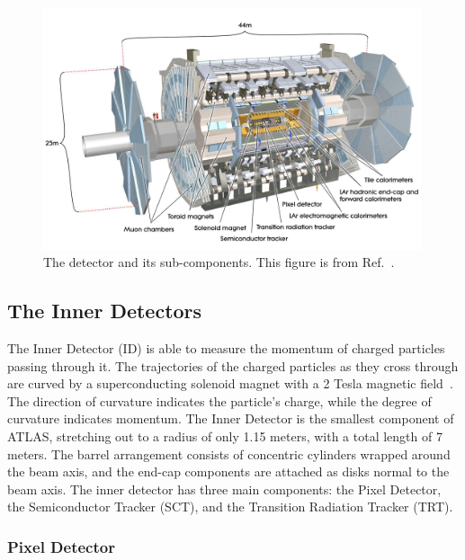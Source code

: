 

\begin{figure}[htb!]
    \centering
    \includegraphics[width=0.99\textwidth]{Figures/LHC/ATLASDetector.jpg}
    \caption{The \ATLAS detector and its sub-components. This figure is from Ref.~\cite{Reed:2014}.}
    \label{fig:atlasdetector}
\end{figure}

\subsection{The Inner Detectors} \label{ssec:ATLASID}
The Inner Detector (ID) is able to measure the momentum of charged particles passing through it. The trajectories of the charged particles as they cross through are curved by a superconducting solenoid magnet with a 2 Tesla magnetic field~\cite{Yamamoto:1999}. The direction of curvature indicates the particle's charge, while the degree of curvature indicates momentum. The Inner Detector is the smallest component of ATLAS, stretching out to a radius of only 1.15 meters, with a total length of 7 meters. The barrel arrangement consists of concentric cylinders wrapped around the beam axis, and the end-cap components are attached as disks normal to the beam axis. The inner detector has three main components: the Pixel Detector, the Semiconductor Tracker (SCT), and the Transition Radiation Tracker (TRT).

\subsubsection{Pixel Detector}

